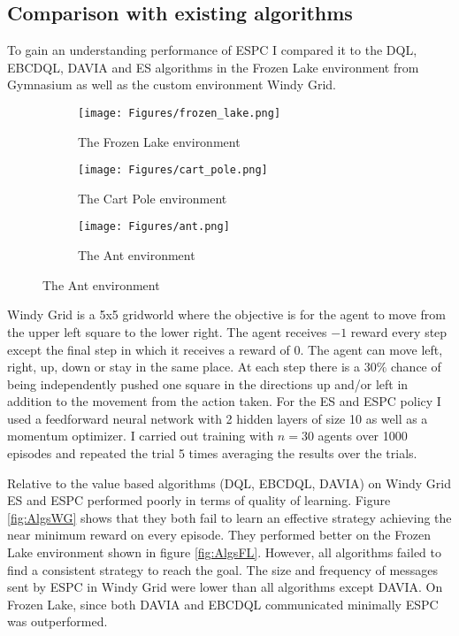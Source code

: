 \subsection{Comparison with existing algorithms}
To gain an understanding performance of ESPC I compared it to the DQL, EBCDQL, DAVIA and ES algorithms in the Frozen Lake environment from Gymnasium as well as the custom environment Windy Grid.

\begin{figure}
    \centering
    \begin{subfigure}{0.4\textwidth}
        \centering
        \texttt{[image: Figures/frozen\_lake.png]}
        \caption{The Frozen Lake environment}
        \label{fig:FrozenLake}
    \end{subfigure}
    \begin{subfigure}{0.4\textwidth}
        \centering
        \texttt{[image: Figures/cart\_pole.png]}
        \caption{The Cart Pole environment}
        \label{fig:CartPole}
    \end{subfigure}
    \begin{subfigure}{0.5\textwidth}
        \centering
        \texttt{[image: Figures/ant.png]}
        \caption{The Ant environment}
        \label{fig:Ant}
    \end{subfigure}
\end{figure}

Windy Grid is a 5x5 gridworld where the objective is for the agent to move from the upper left square to the lower right. The agent receives $-1$ reward every step except the final step in which it receives a reward of $0$. The agent can move left, right, up, down or stay in the same place. At each step there is a $30\%$ chance of being independently pushed one square in the directions up and/or left in addition to the movement from the action taken. For the ES and ESPC policy I used a feedforward neural network with 2 hidden layers of size 10 as well as a momentum optimizer.
I carried out training with $n=30$ agents over 1000 episodes and repeated the trial 5 times averaging the results over the trials. 

Relative to the value based algorithms (DQL, EBCDQL, DAVIA) on Windy Grid ES and ESPC performed poorly in terms of quality of learning. Figure \ref{fig:AlgsWG} shows that they both fail to learn an effective strategy achieving the near minimum reward on every episode. They performed better on the Frozen Lake environment shown in figure \ref{fig:AlgsFL}. However, all algorithms failed to find a consistent strategy to reach the goal. The size and frequency of messages sent by ESPC in Windy Grid were lower than all algorithms except DAVIA. On Frozen Lake, since both DAVIA and EBCDQL communicated minimally ESPC was outperformed.

